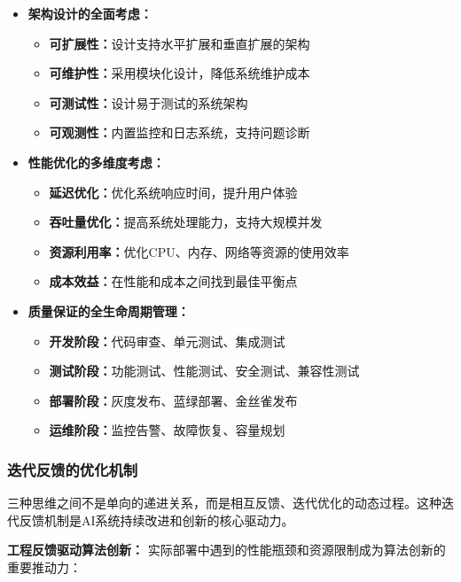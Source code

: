 \begin{itemize}
\item \textbf{架构设计的全面考虑：}
\begin{itemize}
\item \textbf{可扩展性：}设计支持水平扩展和垂直扩展的架构
\item \textbf{可维护性：}采用模块化设计，降低系统维护成本
\item \textbf{可测试性：}设计易于测试的系统架构
\item \textbf{可观测性：}内置监控和日志系统，支持问题诊断
\end{itemize}

\item \textbf{性能优化的多维度考虑：}
\begin{itemize}
\item \textbf{延迟优化：}优化系统响应时间，提升用户体验
\item \textbf{吞吐量优化：}提高系统处理能力，支持大规模并发
\item \textbf{资源利用率：}优化CPU、内存、网络等资源的使用效率
\item \textbf{成本效益：}在性能和成本之间找到最佳平衡点
\end{itemize}

\item \textbf{质量保证的全生命周期管理：}
\begin{itemize}
\item \textbf{开发阶段：}代码审查、单元测试、集成测试
\item \textbf{测试阶段：}功能测试、性能测试、安全测试、兼容性测试
\item \textbf{部署阶段：}灰度发布、蓝绿部署、金丝雀发布
\item \textbf{运维阶段：}监控告警、故障恢复、容量规划
\end{itemize}
\end{itemize}

\subsubsection{迭代反馈的优化机制}

三种思维之间不是单向的递进关系，而是相互反馈、迭代优化的动态过程。这种迭代反馈机制是AI系统持续改进和创新的核心驱动力。

\textbf{工程反馈驱动算法创新：}
实际部署中遇到的性能瓶颈和资源限制成为算法创新的重要推动力：

